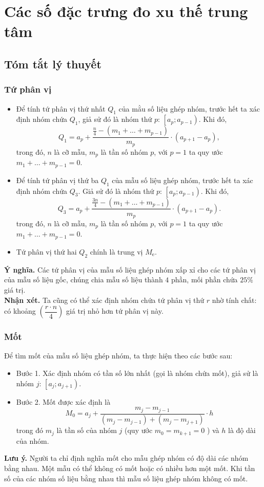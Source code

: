 
\section{Các số đặc trưng đo xu thế trung tâm}
\subsection{Tóm tắt lý thuyết}
\begin{tomtat}
	\subsubsection{Tứ phân vị}
	\begin{itemize}
		\item Để tính tứ phân vị thứ nhất $Q_1$ của mằu số liệu ghép nhóm, trước hết ta xác định nhóm chứa $Q_1$, giả sử đó là nhóm thứ $p$: $\left[a_p ; a_{p-1}\right)$. Khi đó,
		$$
		Q_1=a_p+\dfrac{\frac{n}{4}-\left(m_1+\ldots+m_{p-1}\right)}{m_p}\cdot\left(a_{p+1}-a_p\right),
		$$
		trong đó, $n$ là cỡ mẫu, $m_p$ là tần số nhóm $p$, với $p=1$ ta quy ước $m_1+\ldots+m_{p-1}=0$.
		\item Để tính tứ phân vị thứ ba $Q_1$ của mẫu số liệu ghép nhóm, trước hết ta xác định nhóm chứa $Q_3$. Giả sử đó là nhóm thứ $p$: $\left[a_p ; a_{p-1}\right)$. Khi đó,
		$$
		Q_3=a_p+\dfrac{\frac{3 n}{4}-\left(m_1+\ldots+m_{p-1}\right)}{m_p}\cdot\left(a_{p+1}-a_p\right) .
		$$
		trong đó, $n$ là cỡ mẫu, $m_p$ là tần số nhóm $p$, với $p=1$ ta quy ước $m_1+\ldots+m_{p-1}=0$.
		\item Tứ phân vị thứ hai $Q_2$ chính là trung vị $M_{\text{e}}$.
	\end{itemize}
	\textbf{Ý nghĩa.} Các tứ phân vị của mẫu số liệu ghép nhóm xấp xỉ cho các tứ phân vị của mẫu số liệu gốc, chúng chia mẫu số liệu thành $4$ phần, mối phần chứa $25 \%$ giá trị.\\
	\textbf{Nhận xét.} Ta cũng có thể xác định nhóm chứa tứ phân vị thứ $r$ nhờ tính chất: có khoảng $\left(\dfrac{r \cdot n}{4}\right)$ giá trị nhỏ hơn tứ phân vị này.
	\subsubsection{Mốt}
	Để tìm mốt của mẫu số liệu ghép nhóm, ta thực hiện theo các bước sau:
	\begin{itemize}
		\item Bước 1. Xác định nhóm có tần số lớn nhất (gọi là nhóm chứa mốt), giả sử là nhóm $j$: $\left[a_j;a_{j+1}\right)$.
		\item Bước 2. Mốt được xác định là
		$$M_0=a_j+\frac{m_j-m_{j-1}}{\left(m_j-m_{j-1}\right)+\left(m_j-m_{j+1}\right)}\cdot h$$ trong đó $m_j$ là tần số của nhóm $j$ (quy ước $m_0=m_{k+1}=0$ ) và $h$ là độ dài của nhóm.
	\end{itemize}
	\textbf{Lưu ý.} Người ta chỉ định nghĩa mốt cho mẫu ghép nhóm có độ dài các nhóm bằng nhau. Một mẫu có thể không có mốt hoặc có nhiều hơn một mốt.
	Khi tần số của các nhóm số liệu bằng nhau thì mẫu số liệu ghép nhóm không có mốt. 
\end{tomtat}
